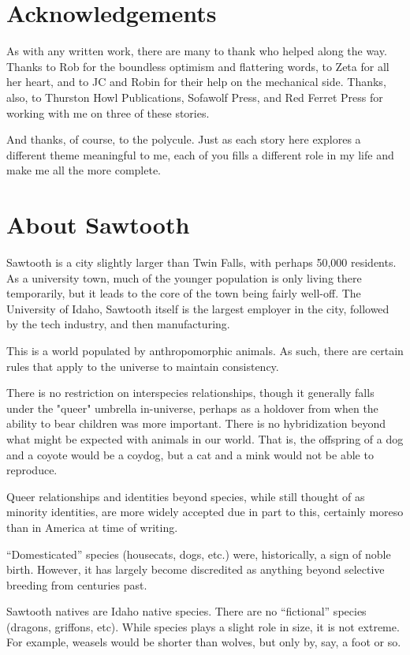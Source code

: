 \chapter*{Acknowledgements}

As with any written work, there are many to thank who helped along the way. Thanks to Rob for the boundless optimism and flattering words, to Zeta for all her heart, and to JC and Robin for their help on the mechanical side. Thanks, also, to Thurston Howl Publications, Sofawolf Press, and Red Ferret Press for working with me on three of these stories.

And thanks, of course, to the polycule. Just as each story here explores a different theme meaningful to me, each of you fills a different role in my life and make me all the more complete.

\chapter*{About Sawtooth}

Sawtooth is a city slightly larger than Twin Falls, with perhaps 50,000 residents. As a university town, much of the younger population is only living there temporarily, but it leads to the core of the town being fairly well-off. The University of Idaho, Sawtooth itself is the largest employer in the city, followed by the tech industry, and then manufacturing.

This is a world populated by anthropomorphic animals. As such, there are certain rules that apply to the universe to maintain consistency.

There is no restriction on interspecies relationships, though it generally falls under the "queer" umbrella in-universe, perhaps as a holdover from when the ability to bear children was more important. There is no hybridization beyond what might be expected with animals in our world. That is, the offspring of a dog and a coyote would be a coydog, but a cat and a mink would not be able to reproduce.

Queer relationships and identities beyond species, while still thought of as minority identities, are more widely accepted due in part to this, certainly moreso than in America at time of writing.

``Domesticated'' species (housecats, dogs, etc.) were, historically, a sign of noble birth. However, it has largely become discredited as anything beyond selective breeding from centuries past.

Sawtooth natives are Idaho native species. There are no ``fictional'' species (dragons, griffons, etc). While species plays a slight role in size, it is not extreme. For example, weasels would be shorter than wolves, but only by, say, a foot or so.

